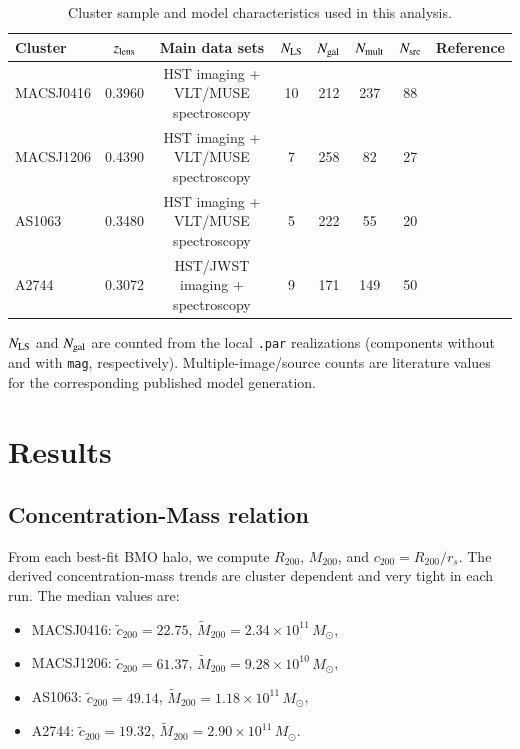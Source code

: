 \documentclass{aa}
\begin{document}
\begin{table}
\centering
\begin{threeparttable}
\caption{Cluster sample and model characteristics used in this analysis.}
\label{tab:data}
\begin{tabular}{lccccccc}
\toprule
Cluster & $z_{\rm lens}$ & Main data sets & $N_{\rm LS}$ & $N_{\rm gal}$ & $N_{\rm mult}$ & $N_{\rm src}$ & Reference \\
\midrule
MACSJ0416 & 0.3960 & HST imaging + VLT/MUSE spectroscopy & 10 & 212 & 237 & 88 & \citealt{Bergamini2023a} \\
MACSJ1206 & 0.4390 & HST imaging + VLT/MUSE spectroscopy & 7 & 258 & 82 & 27 & \citealt{Bergamini2019} \\
AS1063    & 0.3480 & HST imaging + VLT/MUSE spectroscopy & 5 & 222 & 55 & 20 & \citealt{Bergamini2019} \\
A2744     & 0.3072 & HST/JWST imaging + spectroscopy & 9 & 171 & 149 & 50 & \citealt{Bergamini2023b} \\
\bottomrule
\end{tabular}
\begin{tablenotes}
\item $N_{\rm LS}$ and $N_{\rm gal}$ are counted from the local \texttt{.par} realizations (components without and with \texttt{mag}, respectively). Multiple-image/source counts are literature values for the corresponding published model generation.
\end{tablenotes}
\end{threeparttable}
\end{table}

\section{Results}

\subsection{Concentration-Mass relation}
From each best-fit BMO halo, we compute $R_{200}$, $M_{200}$, and $c_{200}=R_{200}/r_s$. The derived concentration-mass trends are cluster dependent and very tight in each run. The median values are:
\begin{itemize}
\item MACSJ0416: $\tilde{c}_{200}=22.75$, $\widetilde{M}_{200}=2.34\times10^{11}\,M_\odot$,
\item MACSJ1206: $\tilde{c}_{200}=61.37$, $\widetilde{M}_{200}=9.28\times10^{10}\,M_\odot$,
\item AS1063: $\tilde{c}_{200}=49.14$, $\widetilde{M}_{200}=1.18\times10^{11}\,M_\odot$,
\item A2744: $\tilde{c}_{200}=19.32$, $\widetilde{M}_{200}=2.90\times10^{11}\,M_\odot$.
\end{itemize}
\end{document}
